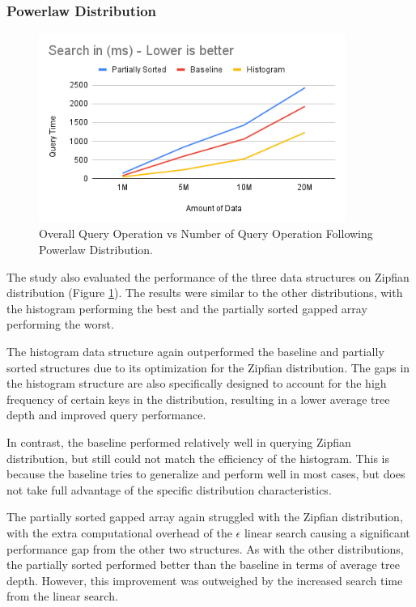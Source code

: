 \subsubsection{Powerlaw Distribution}
\begin{figure}[H]
    \centering
    \includegraphics[width=100mm,scale=1]{Figures/QueryPowerlaw.png}
    \caption{
Overall Query Operation vs Number of Query Operation Following Powerlaw Distribution.
    }
    \label{fig:QueryResultPowerlaw}
\end{figure}
The study also evaluated the performance of the three data structures on Zipfian distribution (Figure \ref{fig:QueryResultPowerlaw}). The results were similar to the other distributions, with the histogram performing the best and the partially sorted gapped array performing the worst.

The histogram data structure again outperformed the baseline and partially sorted \learnindex structures due to its optimization for the Zipfian distribution. The gaps in the histogram structure are also specifically designed to account for the high frequency of certain keys in the distribution, resulting in a lower average tree depth and improved query performance.

In contrast, the baseline \learnindex performed relatively well in querying Zipfian distribution, but still could not match the efficiency of the histogram. This is because the baseline tries to generalize and perform well in most cases, but does not take full advantage of the specific distribution characteristics.

The partially sorted gapped array again struggled with the Zipfian distribution, with the extra computational overhead of the $\epsilon$ linear search causing a significant performance gap from the other two structures. As with the other distributions, the partially sorted \learnindex performed better than the baseline \learnindex in terms of average tree depth. However, this improvement was outweighed by the increased search time from the linear search.

